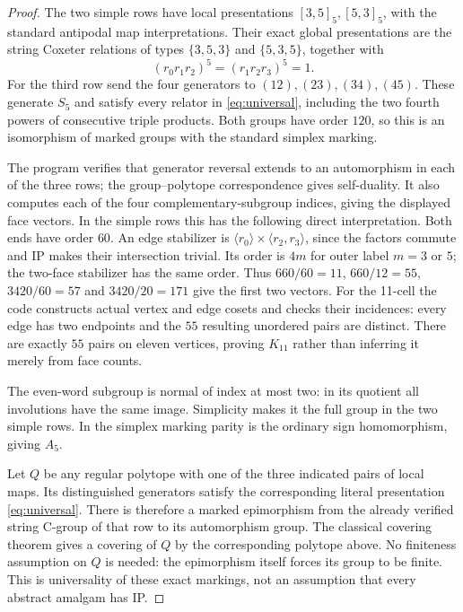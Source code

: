 \documentclass[11pt,a4paper]{article}
\begin{document}
\begin{proof}
The two simple rows have local presentations $[3,5]_5,[5,3]_5$, with the
standard antipodal map interpretations. Their exact global presentations
are the string Coxeter relations of types $\{3,5,3\}$ and $\{5,3,5\}$,
together with
\[
 (r_0r_1r_2)^5=(r_1r_2r_3)^5=1.
\]
For the third row send the four generators to $(12),(23),(34),(45)$.
These generate $S_5$ and satisfy every relator in
\eqref{eq:universal}, including the two fourth powers of consecutive
triple products. Both groups have order $120$, so this is an isomorphism
of marked groups with the standard simplex marking.

The program verifies that generator reversal extends to an automorphism
in each of the three rows; the group--polytope correspondence gives self-duality.
It also computes each of the four complementary-subgroup indices, giving
the displayed face vectors. In the simple rows this has the following
direct interpretation. Both ends have order $60$. An edge stabilizer is
$\langle r_0\rangle\times\langle r_2,r_3\rangle$, since the factors
commute and IP makes their intersection trivial. Its order is $4m$ for
outer label $m=3$ or $5$; the two-face stabilizer has the same order.
Thus $660/60=11$, $660/12=55$, $3420/60=57$ and $3420/20=171$ give the
first two vectors. For the 11-cell the code constructs actual vertex and
edge cosets and checks their incidences: every edge has two endpoints and
the $55$ resulting unordered pairs are distinct. There are exactly $55$
pairs on eleven vertices, proving $K_{11}$ rather than inferring it merely
from face counts.

The even-word subgroup is normal of index at most two: in its quotient
all involutions have the same image. Simplicity makes it the full group
in the two simple rows. In the simplex marking parity is the ordinary
sign homomorphism, giving $A_5$.

Let $Q$ be any regular polytope with one of the three indicated pairs of
local maps. Its distinguished generators satisfy the corresponding
literal presentation \eqref{eq:universal}. There is therefore a marked
epimorphism from the already verified string C-group of that row to its
automorphism group. The classical covering theorem gives a covering of
$Q$ by the corresponding polytope above. No finiteness assumption on $Q$
is needed: the epimorphism itself forces its group to be finite. This is
universality of these exact markings, not an assumption that every
abstract amalgam has IP.
\end{proof}
\end{document}
